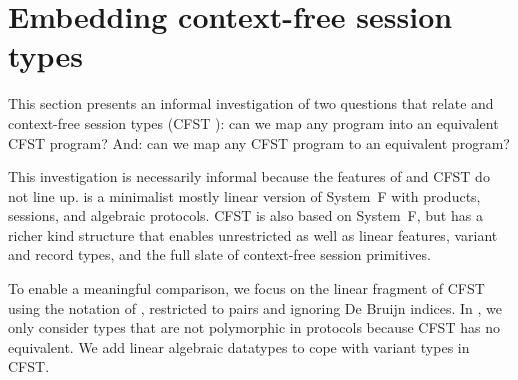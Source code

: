 \section{Embedding context-free session types}
\label{sec:appendix-cfst-algst}

This section presents an informal investigation of two questions that relate \algst and
context-free session types (CFST
\cite{DBLP:journals/corr/abs-2106-06658}): can we map any \algst
program into an equivalent CFST program? And: can we map any CFST program to an
equivalent \algst program?

This investigation is necessarily informal because the features of
\algst and CFST do not line up. \algst is a minimalist mostly linear
version of System~F with products, sessions, and algebraic
protocols. CFST is also based on System~F, but has a richer kind
structure that enables unrestricted as well as linear features,
variant and record types, and the full slate of context-free session
primitives.

To enable a meaningful comparison,  we focus on the linear fragment of
CFST~\cite{DBLP:journals/corr/abs-2106-06658}
using the notation of \citet{DBLP:journals/corr/abs-2203-12877},
restricted to pairs and ignoring De Bruijn indices.
In \algst, we only consider types that are not polymorphic in
protocols because CFST has no equivalent. We add linear algebraic
datatypes to cope with variant types in CFST.



%

